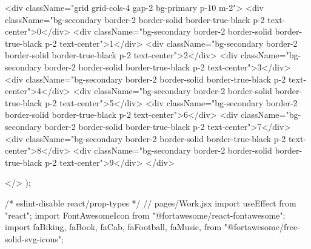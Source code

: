 {<div className="grid grid-cols-4 gap-2 bg-primary p-10 m-2">
  <div className="bg-secondary border-2 border-solid border-true-black p-2 text-center">0</div>
  <div className="bg-secondary border-2 border-solid border-true-black p-2 text-center">1</div>
  <div className="bg-secondary border-2 border-solid border-true-black p-2 text-center">2</div>
  <div className="bg-secondary border-2 border-solid border-true-black p-2 text-center">3</div>  
  <div className="bg-secondary border-2 border-solid border-true-black p-2 text-center">4</div>
  <div className="bg-secondary border-2 border-solid border-true-black p-2 text-center">5</div>
  <div className="bg-secondary border-2 border-solid border-true-black p-2 text-center">6</div>  
  <div className="bg-secondary border-2 border-solid border-true-black p-2 text-center">7</div>
  <div className="bg-secondary border-2 border-solid border-true-black p-2 text-center">8</div>
  <div className="bg-secondary border-2 border-solid border-true-black p-2 text-center">9</div>  
</div>

    </>
  );
}


/* eslint-disable react/prop-types */
// pages/Work.jsx
import { useEffect } from "react";
import { FontAwesomeIcon } from "@fortawesome/react-fontawesome";
import {
  faBiking,
  faBook,
  faCab,
  faFootball,
  faMusic,
} from "@fortawesome/free-solid-svg-icons";

